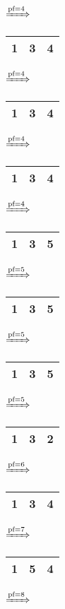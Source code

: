 \documentclass{article}
\begin{document}
\begin{itemize}
\begin{tabular}{|c|c|c|}
        \end{tabular}
        $\xRightarrow{\text{pf}=4}$
        \begin{tabular}{|c|c|c|}
            \hline
            1 & 3 & 4\\
            \hline
        \end{tabular}
        $\xRightarrow{\text{pf}=4}$
        \begin{tabular}{|c|c|c|}
            \hline
            1 & 3 & 4\\
            \hline
        \end{tabular}
        $\xRightarrow{\text{pf}=4}$
        \begin{tabular}{|c|c|c|}
            \hline
            1 & 3 & 4\\
            \hline
        \end{tabular}
        $\xRightarrow{\text{pf}=4}$
        \begin{tabular}{|c|c|c|}
            \hline
            1 & 3 & 5\\
            \hline
        \end{tabular}
        $\xRightarrow{\text{pf}=5}$
        \begin{tabular}{|c|c|c|}
            \hline
            1 & 3 & 5\\
            \hline
        \end{tabular}
        $\xRightarrow{\text{pf}=5}$
        \begin{tabular}{|c|c|c|}
            \hline
            1 & 3 & 5\\
            \hline
        \end{tabular}
        $\xRightarrow{\text{pf}=5}$
        \begin{tabular}{|c|c|c|}
            \hline
            1 & 3 & 2\\
            \hline
        \end{tabular}
        $\xRightarrow{\text{pf}=6}$
        \begin{tabular}{|c|c|c|}
            \hline
            1 & 3 & 4\\
            \hline
        \end{tabular}
        $\xRightarrow{\text{pf}=7}$
        \begin{tabular}{|c|c|c|}
            \hline
            1 & 5 & 4\\
            \hline
        \end{tabular}
        $\xRightarrow{\text{pf}=8}$
        \begin{tabular}{|c|c|c|}

\end{tabular}
\end{itemize}
\end{document}
